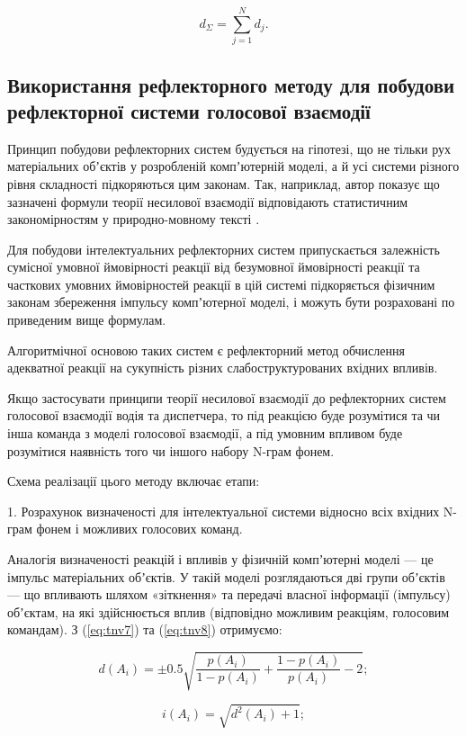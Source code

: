 \begin{equation}
\label{eq:tnv11}
d_\Sigma = \sum_{j=1}^N d_j.
\end{equation}


\subsection{Використання рефлекторного методу для побудови рефлекторної системи голосової взаємодії} \label{subsect2_4_2}

Принцип побудови рефлекторних систем будується на гіпотезі, що не тільки рух матеріальних обʼєктів у розробленій компʼютерній моделі, а й усі системи різного рівня складності підкоряються цим законам. Так, наприклад, автор показує що зазначені формули теорії несилової взаємодії відповідають статистичним закономірностям у природно-мовному тексті \cite[розділ 8]{Teslia_2010}.

Для побудови інтелектуальних рефлекторних систем припускається залежність сумісної умовної ймовірності реакції від безумовної ймовірності реакції та часткових умовних ймовірностей реакції в цій системі підкоряється фізичним законам збереження імпульсу компʼютерної моделі, і можуть бути розраховані по приведеним вище формулам.

Алгоритмічної основою таких систем є рефлекторний метод обчислення адекватної реакції на сукупність різних слабоструктурованих вхідних впливів.

Якщо застосувати принципи теорії несилової взаємодії до рефлекторних систем голосової взаємодії водія та диспетчера, то під реакцією буде розумітися та чи інша команда з моделі голосової взаємодії, а під умовним впливом буде розумітися наявність того чи іншого набору N-грам фонем.

Схема реалізації цього методу включає етапи:

1. Розрахунок визначеності для інтелектуальної системи відносно всіх вхідних N-грам фонем і можливих голосових команд.

Аналогія визначеності реакцій і впливів у фізичній компʼютерні моделі --- це імпульс матеріальних обʼєктів. У такій моделі розглядаються дві групи обʼєктів --- що впливають шляхом «зіткнення» та передачі власної інформації (імпульсу) обʼєктам, на які здійснюється вплив (відповідно можливим реакціям, голосовим командам). З (\ref{eq:tnv7}) та (\ref{eq:tnv8}) отримуємо:

\[
d(A_i)=\pm0.5\sqrt{\frac{p(A_i)}{1-p(A_i)}+\frac{1-p(A_i)}{p(A_i)}-2};
\]

\[
i(A_i)=\sqrt{d^2(A_i)+1};
\]

